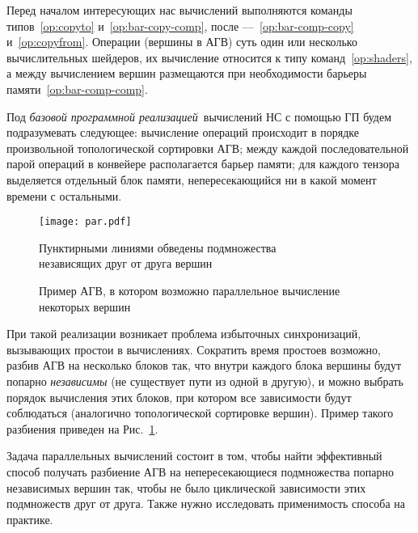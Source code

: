 Перед началом интересующих нас вычислений выполняются команды
типов~\ref{op:copyto} и~\ref{op:bar-copy-comp}, после —~\ref{op:bar-comp-copy}
и~\ref{op:copyfrom}. Операции (вершины в АГВ) суть один или несколько
вычислительных шейдеров, их вычисление относится к типу команд~\ref{op:shaders},
а между вычислением вершин размещаются при необходимости барьеры
памяти~\ref{op:bar-comp-comp}.

Под \textit{базовой программной реализацией} вычислений НС с помощью ГП будем
подразумевать следующее: вычисление операций происходит в порядке произвольной
топологической сортировки АГВ; между каждой последовательной парой операций в
конвейере располагается барьер памяти; для каждого тензора выделяется отдельный
блок памяти, непересекающийся ни в какой момент времени с остальными.

\begin{figure}
\centering
\texttt{[image: par.pdf]}
\caption{Пример АГВ, в котором возможно параллельное вычисление некоторых вершин}
\label{parcfg}
Пунктирными линиями обведены подмножества\\ независящих друг от друга вершин
\end{figure}

При такой реализации возникает проблема избыточных синхронизаций, вызывающих
простои в вычислениях. Сократить время простоев возможно, разбив АГВ на
несколько блоков так, что внутри каждого блока вершины будут попарно
\textit{независимы} (не существует пути из одной в другую), и можно выбрать
порядок вычисления этих блоков, при котором все зависимости будут соблюдаться
(аналогично топологической сортировке вершин). Пример такого разбиения приведен
на Рис.~\ref{parcfg}.

Задача параллельных вычислений состоит в том, чтобы найти эффективный способ
получать разбиение АГВ на непересекающиеся подмножества попарно независимых
вершин так, чтобы не было циклической зависимости этих подмножеств друг от
друга. Также нужно исследовать применимость способа на практике.
